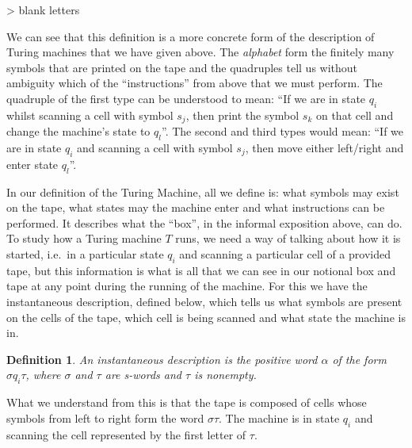 \documentclass[12pt]{article}
\newtheorem{definition}{Definition}
\theoremstyle{definition}
\numberwithin{equation}{theorem}
\begin{document}
> blank letters

We can see that this definition is a more concrete form of the description of Turing machines that we have given above. The \emph{alphabet} form the finitely many symbols that are printed on the tape and the quadruples tell us without ambiguity which of the ``instructions'' from above that we must perform. The quadruple of the first type can be understood to mean: ``If we are in state $q_i$ whilst scanning a cell with symbol $s_j$, then print the symbol $s_k$ on that cell and change the machine's state to $q_l$''. The second and third types would mean: ``If we are in state $q_i$ and scanning a cell with symbol $s_j$, then move either left/right and enter state $q_l$''.

In our definition of the Turing Machine, all we define is: what symbols may exist on the tape, what states may the machine enter and what instructions can be performed. It describes what the ``box'', in the informal exposition above, can do. To study how a Turing machine $T$ runs, we need a way of talking about how it is started, i.e.\ in a particular state $q_i$ and scanning a particular cell of a provided tape, but this information is what is all that we can see in our notional box and tape at any point during the running of the machine. For this we have the instantaneous description, defined below, which tells us what symbols are present on the cells of the tape, which cell is being scanned and what state the machine is in.

\begin{definition}
  An \emph{instantaneous description} is the positive word $\alpha$ of the form $\sigma q_i \tau$, where $\sigma$ and $\tau$ are s-words and $\tau$ is nonempty.
\end{definition}

What we understand from this is that the tape is composed of cells whose symbols from left to right form the word $\sigma\tau$. The machine is in state $q_i$ and scanning the cell represented by the first letter of $\tau$.
\end{document}
